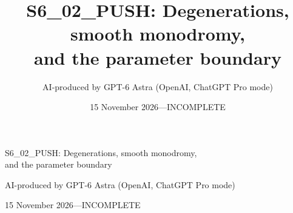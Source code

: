 \documentclass[11pt,a4paper]{article}
\title{S6\_02\_PUSH: Degenerations, smooth monodromy,\protect\\and the parameter boundary}
\author{AI-produced by GPT-6 Astra (OpenAI, ChatGPT Pro mode)}
\date{15 November 2026\quad---\quad INCOMPLETE}
\theoremstyle{definition}
\begin{document}
\begin{center}
{\Large S6\_02\_PUSH: Degenerations, smooth monodromy,\\and the parameter boundary\par}
\vspace{6pt}
{\small AI-produced by GPT-6 Astra (OpenAI, ChatGPT Pro mode)\par}
{\small 15 November 2026\quad---\quad INCOMPLETE\par}
\end{center}
\begingroup
\fontsize{10}{11.5}\selectfont
\setlength{\abovedisplayskip}{5pt}
\setlength{\belowdisplayskip}{5pt}

\endgroup
\clearpage
\tableofcontents
\clearpage
{}


\end{document}

